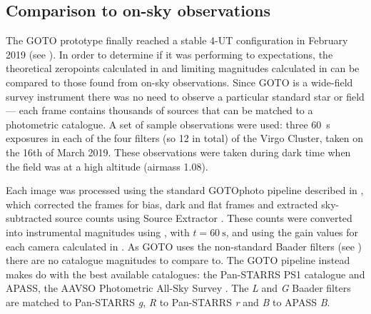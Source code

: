 \subsection{Comparison to on-sky observations}
\label{sec:onsky_comparison}
\begin{colsection}

The GOTO prototype finally reached a stable 4-UT configuration in February 2019 (see ). In order to determine if it was performing to expectations, the theoretical zeropoints calculated in  and limiting magnitudes calculated in  can be compared to those found from on-sky observations. Since GOTO is a wide-field survey instrument there was no need to observe a particular standard star or field --- each frame contains thousands of sources that can be matched to a photometric catalogue. A set of sample observations were used: three \SI{60}{\second} exposures in each of the four filters (so 12 in total) of the Virgo Cluster, taken on the 16th of March 2019. These observations were taken during dark time when the field was at a high altitude (airmass 1.08).

Each image was processed using the standard GOTOphoto pipeline described in , which corrected the frames for bias, dark and flat frames and extracted sky-subtracted source counts using Source Extractor \citep{SE}. These counts were converted into instrumental magnitudes using , with $t=\SI{60}{\second}$, and using the gain values for each camera calculated in . As GOTO uses the non-standard Baader filters (see ) there are no catalogue magnitudes to compare to. The GOTO pipeline instead makes do with the best available catalogues: the Pan-STARRS PS1 catalogue \citep{Pan-STARRS} and APASS, the AAVSO Photometric All-Sky Survey \citep{APASS}. The \textit{L} and \textit{G} Baader filters are matched to Pan-STARRS \textit{g}, \textit{R} to Pan-STARRS \textit{r} and \textit{B} to APASS \textit{B}.

\newpage


\end{colsection}
